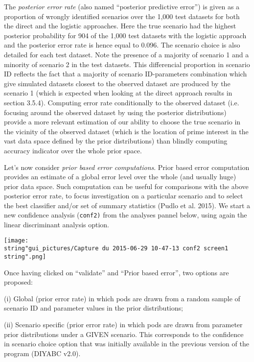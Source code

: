 The \textit{posterior error rate} (also named ``posterior predictive
error'') is given as a proportion of wrongly identified scenarios
over the 1,000 test datasets for both the direct and the logistic
approaches. Here the true scenario had the highest posterior probability
for 904 of the 1,000 test datasets with the logistic approach and
the posterior error rate is hence equal to 0.096. The scenario choice
is also detailed for each test dataset. Note the presence of a majority
of scenario 1 and a minority of scenario 2 in the test datasets. This
differencial proportion in scenario ID reflects the fact that a majority
of scenario ID-parameters combination which give simulated datasets
closest to the observed dataset are produced by the scenario 1 (which
is expected when looking at the direct approach results in section
3.5.4). Computing error rate conditionally to the observed dataset
(i.e. focusing around the observed dataset by using the posterior
distributions) provide a more relevant estimation of our ability to
choose the true scenario in the vicinity of the observed dataset (which
is the location of prime interest in the vast data space defined by
the prior distributions) than blindly computing accuracy indicator
over the whole prior space.

Let's now consider \textit{prior based error computations}. Prior
based error computation provides an estimate of a global error level
over the whole (and usually huge) prior data space. Such computation
can be useful for comparisons with the above posterior error rate,
to focus investigation on a particular scenario and to select the
best classifier and/or set of summary statistics (Pudlo et al. 2015).
We start a new confidence analysis (\texttt{conf2)} from the analyses
pannel below, using again the linear discriminant analysis option.

\texttt{[image: \\string"gui\_pictures/Capture du 2015-06-29 10-47-13 conf2 screen1\\string".png]}

Once having clicked on ``validate'' and ``Prior based error'',
two options are proposed:

(i) Global (prior error rate) in which pods are drawn from a random
sample of scenario ID and parameter values in the prior distributions;

(ii) Scenario specific (prior error rate) in which pods are drawn
from parameter prior distributions under a GIVEN scenario. This corresponds
to the confidence in scenario choice option that was initially available
in the previous version of the program (DIYABC v2.0).

